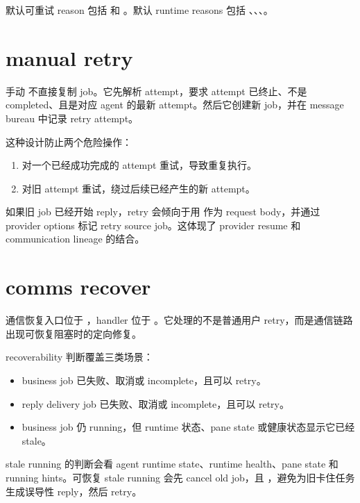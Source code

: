 默认可重试 reason 包括  和 。默认 runtime reasons 包括 、、、。

\section{manual retry}

手动  不直接复制 job。它先解析 attempt，要求 attempt 已终止、不是 completed、且是对应 agent 的最新 attempt。然后它创建新 job，并在 message bureau 中记录 retry attempt。

这种设计防止两个危险操作：

\begin{enumerate}
  \item 对一个已经成功完成的 attempt 重试，导致重复执行。
  \item 对旧 attempt 重试，绕过后续已经产生的新 attempt。
\end{enumerate}

如果旧 job 已经开始 reply，retry 会倾向于用  作为 request body，并通过 provider options 标记 retry source job。这体现了 provider resume 和 communication lineage 的结合。

\section{comms recover}

通信恢复入口位于 ，handler 位于 。它处理的不是普通用户 retry，而是通信链路出现可恢复阻塞时的定向修复。

recoverability 判断覆盖三类场景：

\begin{itemize}
  \item business job 已失败、取消或 incomplete，且可以 retry。
  \item reply delivery job 已失败、取消或 incomplete，且可以 retry。
  \item business job 仍 running，但 runtime 状态、pane state 或健康状态显示它已经 stale。
\end{itemize}

stale running 的判断会看 agent runtime state、runtime health、pane state 和 running hints。可恢复 stale running 会先 cancel old job，且 ，避免为旧卡住任务生成误导性 reply，然后 retry。

